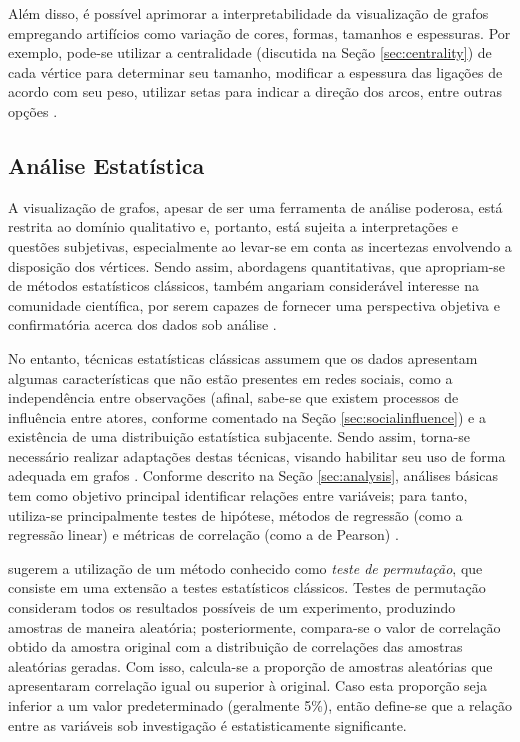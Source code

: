 Além disso, é possível aprimorar a interpretabilidade da visualização de grafos empregando artifícios como variação de cores, formas, tamanhos e espessuras. Por exemplo, pode-se utilizar a centralidade (discutida na Seção \ref{sec:centrality}) de cada vértice para determinar seu tamanho, modificar a espessura das ligações de acordo com seu peso, utilizar setas para indicar a direção dos arcos, entre outras opções \cite{Borgatti2013}.

\subsection{Análise Estatística} \label{sec:correlation}

A visualização de grafos, apesar de ser uma ferramenta de análise poderosa, está restrita ao domínio qualitativo e, portanto, está sujeita a interpretações e questões subjetivas, especialmente ao levar-se em conta as incertezas envolvendo a disposição dos vértices. Sendo assim, abordagens quantitativas, que apropriam-se de métodos estatísticos clássicos, também angariam considerável interesse na comunidade científica, por serem capazes de fornecer uma perspectiva objetiva e confirmatória acerca dos dados sob análise \cite{Atieno2009,Borgatti2013}.

No entanto, técnicas estatísticas clássicas assumem que os dados apresentam algumas características que não estão presentes em redes sociais, como a independência entre observações (afinal, sabe-se que existem processos de influência entre atores, conforme comentado na Seção \ref{sec:socialinfluence}) e a existência de uma distribuição estatística subjacente. Sendo assim, torna-se necessário realizar adaptações destas técnicas, visando habilitar seu uso de forma adequada em grafos \cite{Borgatti2013}. Conforme descrito na Seção \ref{sec:analysis}, análises básicas tem como objetivo principal identificar relações entre variáveis; para tanto, utiliza-se principalmente testes de hipótese, métodos de regressão (como a regressão linear) e métricas de correlação (como a de Pearson) \cite{DeNooy2005,Borgatti2013}.

 sugerem a utilização de um método conhecido como \emph{teste de permutação}, que consiste em uma extensão a testes estatísticos clássicos. Testes de permutação consideram todos os resultados possíveis de um experimento, produzindo amostras de maneira aleatória; posteriormente, compara-se o valor de correlação obtido da amostra original com a distribuição de correlações das amostras aleatórias geradas. Com isso, calcula-se a proporção de amostras aleatórias que apresentaram correlação igual ou superior à original. Caso esta proporção seja inferior a um valor predeterminado (geralmente 5\%), então define-se que a relação entre as variáveis sob investigação é estatisticamente significante.

